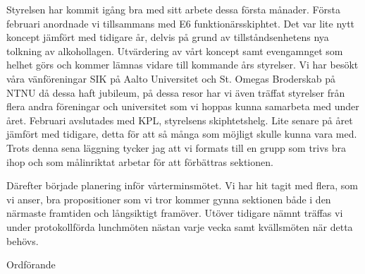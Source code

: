 \documentclass[../_main/handlingar.tex]{subfiles}
\begin{document}

Styrelsen har kommit igång bra med sitt arbete dessa första månader. Första februari anordnade vi tillsammans med E6 funktionärsskiphtet. Det var lite nytt koncept jämfört med tidigare år, delvis på grund av tillståndsenhetens nya tolkning av alkohollagen. Utvärdering av vårt koncept samt evengamnget som helhet görs och kommer lämnas vidare till kommande års styrelser. Vi har besökt våra vänföreningar SIK på Aalto Universitet och St. Omegas Broderskab på NTNU då dessa haft jubileum, på dessa resor har vi även träffat styrelser från flera andra föreningar och universitet som vi hoppas kunna samarbeta med under året. Februari avslutades med KPL, styrelsens skiphtetshelg. Lite senare på året jämfört med tidigare, detta för att så många som möjligt skulle kunna vara med. Trots denna sena läggning tycker jag att vi formats till en grupp som trivs bra ihop och som målinriktat arbetar för att förbättras sektionen. 

Därefter började planering inför vårterminsmötet. Vi har hit tagit med flera, som vi anser, bra propositioner som vi tror kommer gynna sektionen både i den närmaste framtiden och långsiktigt framöver. Utöver tidigare nämnt träffas vi under protokollförda lunchmöten nästan varje vecka samt kvällsmöten när detta behövs.  


\begin{signatures}{1}
    \mvh
    \signature{\ordf}{Ordförande}
\end{signatures}
\end{document}

